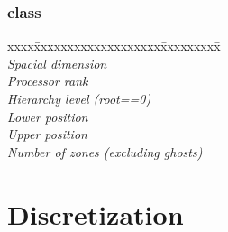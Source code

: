 \documentclass[11pt]{article}
\begin{document}
\subsubsection{ class}

\begin{tabbing}
xxxx\=xxxxxxxxxxxxxxxxxxx\=xxxxxxxxx\=\kill\\ 
\>   \>    \> \textit{Spacial dimension} \\
\>   \>    \> \textit{Processor rank} \\
\>   \>    \> \textit{Hierarchy level (root==0)} \\
\>   \>   \> \textit{Lower position} \\
\>   \>   \> \textit{Upper position} \\
\>   \>    \> \textit{Number of zones (excluding ghosts)} \\
\end{tabbing}

\section{Discretization} \label{s:discretization}

\newcommand{\indvar}{r}
 \newcommand{\uc}{u(\indvar)}

 \newcommand{\uxp}{u(\indvar+h_x)}
 \newcommand{\uxm}{u(\indvar-h_x)}
 \newcommand{\uxph}{u(\indvar+\frac{h_x}{2})}
 \newcommand{\uxmh}{u(\indvar-\frac{h_x}{2})}

 \newcommand{\uyp}{u(\indvar+h_y)}
 \newcommand{\uym}{u(\indvar-h_y)}
 \newcommand{\uyph}{u(\indvar+\frac{h_y}{2})}
 \newcommand{\uymh}{u(\indvar-\frac{h_y}{2})}

 \newcommand{\uzp}{u(\indvar+h_z)}
 \newcommand{\uzm}{u(\indvar-h_z)}
 \newcommand{\uzph}{u(\indvar+\frac{h_z}{2})}
 \newcommand{\uzmh}{u(\indvar-\frac{h_z}{2})}

 \newcommand{\ac}{a(\indvar)}
 \newcommand{\axph}{a(\indvar+\frac{h_x}{2})}
 \newcommand{\axmh}{a(\indvar-\frac{h_x}{2})}
 \newcommand{\ayph}{a(\indvar+\frac{h_y}{2})}
 \newcommand{\aymh}{a(\indvar-\frac{h_y}{2})}
 \newcommand{\azph}{a(\indvar+\frac{h_z}{2})}
 \newcommand{\azmh}{a(\indvar-\frac{h_z}{2})}
\end{document}
